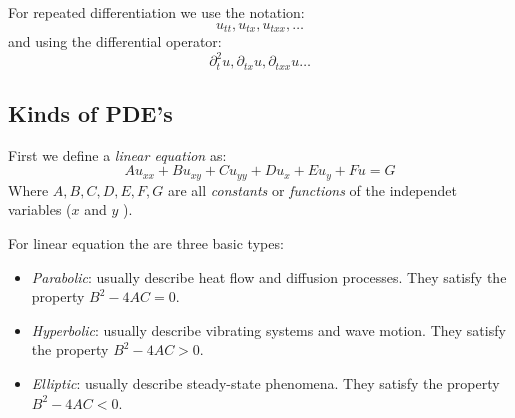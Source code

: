 \documentclass[../pde.tex]{subfiles}
\begin{document}
    For repeated differentiation we use the notation: 
    \begin{equation*}
        u_{tt}, u_{tx}, u_{txx}, \dots
    \end{equation*}
    and using the differential operator:
    \begin{equation*}
        \partial_{t}^2 u, \partial_{tx}u, \partial_{txx}u \dots
    \end{equation*}
    
    
   \subsection{\sffamily Kinds of PDE's}
   First we define a \emph{linear equation} as:
   \begin{equation*}
       Au_{xx}+Bu_{xy}+Cu_{yy}+Du_{x}+Eu_{y}+Fu=G
   \end{equation*}
   Where $A,B,C,D,E,F,G$ are all \emph{constants} or \emph{functions} of the independet variables ($x$ and $y$ ).

   For linear equation the are three basic types:
   \begin{itemize}
        \item \emph{Parabolic}: usually describe heat flow and diffusion processes. They satisfy the property $B^2-4AC=0$.
        \item \emph{Hyperbolic}: usually describe vibrating systems and wave motion. They satisfy the property $B^2-4AC > 0$.
         \item \emph{Elliptic}: usually describe steady-state phenomena. They satisfy the property $B^2-4AC<0$.
   \end{itemize}
   
    
\end{document}
